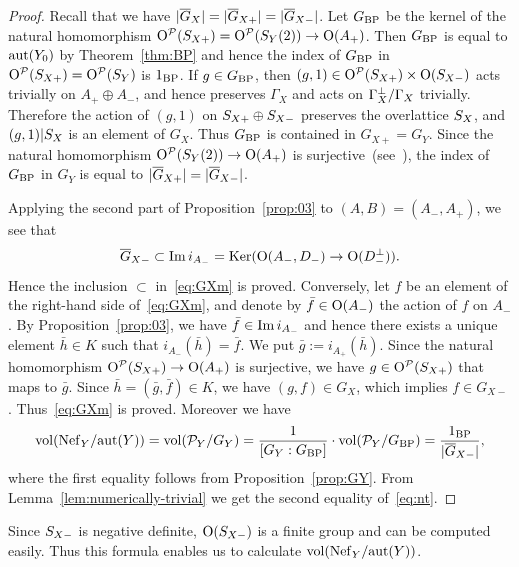 \documentclass{amsart}
\numberwithin{procedure}{section}
\begin{document}
\begin{proof}
Recall that we have
$|\overline{G}_X|=|\overline{G}_{X+}|=|\overline{G}_{X-}|$.
Let $G_{\mathord{\rm{BP}}}$ be the kernel of the natural  homomorphism
$\mathord{\mathrm{O}}^{\mathord{\mathcal P}}(S_{X+})=\mathord{\mathrm{O}}^{\mathord{\mathcal P}}(S_{Y}(2))\to \mathord{\mathrm{O}}(A_+)$.
Then $G_{\mathord{\rm{BP}}}$ is equal to $\mathord{\rm{aut}}(Y_0)$ by Theorem~\ref{thm:BP} and 
hence the index of $G_{\mathord{\rm{BP}}}$ in $\mathord{\mathrm{O}}^{\mathord{\mathcal P}}(S_{X+})= \mathord{\mathrm{O}}^{\mathord{\mathcal P}}(S_{Y})$  is $1_{\mathord{\rm{BP}}}$.
If $g\in G_{\mathord{\rm{BP}}}$, then $(g, 1)\in \mathord{\mathrm{O}}^{\mathord{\mathcal P}}(S_{X+})\times \mathord{\mathrm{O}}(S_{X-})$ 
acts trivially on $A_+\oplus A_-$,
 and hence preserves $\Gamma_X$ and acts on
$\Gamma_X\sp{\perp}/\Gamma_X$ trivially.
Therefore 
the action of $(g, 1)$  on $S_{X+}\oplus S_{X-}$ 
preserves the overlattice $S_{X}$,  and $(g, 1)|S_{X}$ is an element of $G_X$.
Thus  $G_{\mathord{\rm{BP}}}$ is contained in  $G_{X+}=G_Y$.
Since the natural homomorphism
$\mathord{\mathrm{O}}^{\mathord{\mathcal P}}(S_{Y}(2))\to \mathord{\mathrm{O}}(A_+)$ is surjective~(see~\cite{BP1983}),
the index of $G_{\mathord{\rm{BP}}}$ in $G_Y$ is equal to $|\overline{G}_{X+}|=|\overline{G}_{X-}|$.
\par
Applying the second part of Proposition~\ref{prop:03} to
$(A, B)=(A_-, A_+)$,
we see that 
\[
\overline{G}_{X-} \subset \operatorname{\mathrm{Im}}\nolimits i_{A_-}=\operatorname{\mathrm{Ker}}\nolimits (\mathord{\mathrm{O}}(A_-, D_-)\to \mathord{\mathrm{O}}(D_-\sp{\perp})).
\]
Hence the inclusion $\subset$ in~\eqref{eq:GXm} is proved.
Conversely, let $f$ be an element of the right-hand side of~\eqref{eq:GXm},
and denote by $\bar{f}\in \mathord{\mathrm{O}}(A_-)$ 
the action of $f$ on $A_-$.
By Proposition~\ref{prop:03}, we have $\bar{f}\in \operatorname{\mathrm{Im}}\nolimits i_{A_-}$  and hence 
there exists a unique element $\bar{h}\in K$ such that $ i_{A_-}(\bar{h})=\bar{f}$.
We put  $\bar{g}:=i_{A_+}(\bar{h})$.
Since the natural homomorphism $\mathord{\mathrm{O}}^{\mathord{\mathcal P}}(S_{X+})\to \mathord{\mathrm{O}}(A_+)$ is surjective,
we have $g\in \mathord{\mathrm{O}}^{\mathord{\mathcal P}}(S_{X+})$ that maps to $\bar{g}$.
Since $\bar{h}=(\bar{g}, \bar{f})\in K$, we have $(g, f)\in G_X$,
which implies $f\in G_{X-}$. Thus~\eqref{eq:GXm} is proved.
Moreover  we have 
\[
\mathord{\rm{vol}}(\mathord{\rm Nef}_{Y}/\mathord{\rm{aut}}(Y))=\mathord{\rm{vol}}(\mathord{\mathcal P}_Y/G_Y)=\frac{1}{[G_Y: G_{\mathord{\rm{BP}}}]}\cdot \mathord{\rm{vol}}(\mathord{\mathcal P}_Y/G_{\mathord{\rm{BP}}})=\frac{1_{\mathord{\rm{BP}}}}{|\overline{G}_{X-}|},
\]
where the first equality follows from Proposition~\ref{prop:GY}.
From Lemma~\ref{lem:numerically-trivial}
we get the second equality of~\eqref{eq:nt}.
\end{proof}
%
Since $S_{X-}$ is negative definite,
$\mathord{\mathrm{O}}(S_{X-})$ is a finite group and can be computed easily.
Thus this formula enables us to calculate $\mathord{\rm{vol}}(\mathord{\rm Nef}_{Y}/\mathord{\rm{aut}}(Y))$.
%
\end{document}
